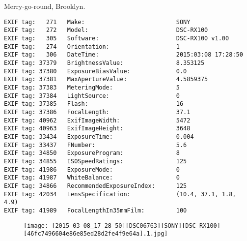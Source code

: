 \section{\protect{}}
\noindent Merry-go-round, Brooklyn.
\noindent
\begin{lstlisting}
EXIF tag:   271   Make:                          SONY
EXIF tag:   272   Model:                         DSC-RX100
EXIF tag:   305   Software:                      DSC-RX100 v1.00
EXIF tag:   274   Orientation:                   1
EXIF tag:   306   DateTime:                      2015:03:08 17:28:50
EXIF tag: 37379   BrightnessValue:               8.353125
EXIF tag: 37380   ExposureBiasValue:             0.0
EXIF tag: 37381   MaxApertureValue:              4.5859375
EXIF tag: 37383   MeteringMode:                  5
EXIF tag: 37384   LightSource:                   0
EXIF tag: 37385   Flash:                         16
EXIF tag: 37386   FocalLength:                   37.1
EXIF tag: 40962   ExifImageWidth:                5472
EXIF tag: 40963   ExifImageHeight:               3648
EXIF tag: 33434   ExposureTime:                  0.004
EXIF tag: 33437   FNumber:                       5.6
EXIF tag: 34850   ExposureProgram:               8
EXIF tag: 34855   ISOSpeedRatings:               125
EXIF tag: 41986   ExposureMode:                  0
EXIF tag: 41987   WhiteBalance:                  0
EXIF tag: 34866   RecommendedExposureIndex:      125
EXIF tag: 42034   LensSpecification:             (10.4, 37.1, 1.8, 4.9)
EXIF tag: 41989   FocalLengthIn35mmFilm:         100

\end{lstlisting}
\clearpage
\begin{figure}
\raggedleft
\texttt{[image: [2015-03-08\_17-28-50][DSC06763][SONY][DSC-RX100][46fc7496604e86e85ed28d2fe4f9e64a].1.jpg]}
\end{figure}


\clearpage
